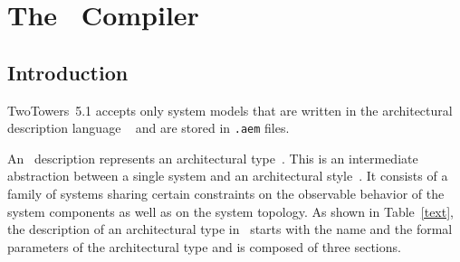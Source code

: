 \chapter{The \aemilia\ Compiler}


\section{Introduction}

TwoTowers~5.1 accepts only system models that are written in the architectural description language
\aemilia~\cite{BDC,BBS} and are stored in {\tt .aem} files.

An \aemilia\ description represents an architectural type~\cite{BCD,AB}. This is an intermediate abstraction
between a single system and an architectural style~\cite{SG}. It consists of a family of systems sharing
certain constraints on the observable behavior of the system components as well as on the system topology.
As shown in Table~\ref{text}, the description of an architectural type in \aemilia\ starts with the name and
the formal parameters of the architectural type and is composed of three sections.

